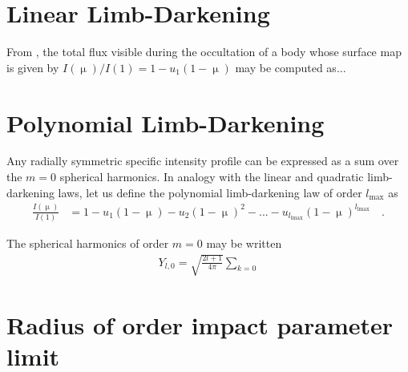 \documentclass[modern]{aastex61}
\begin{document}
%
\section{Linear Limb-Darkening}
\label{sec:reparam}

From \citet{MandelAgol2002}, the total flux visible during the occultation of a  
body whose surface map is given by $I(\upmu)/I(1) = 1 - u_1(1 - \upmu)$ may be computed
as...

%
\section{Polynomial Limb-Darkening}
\label{sec:quad}

Any radially symmetric specific intensity profile can be expressed as a sum
over the $m = 0$ spherical harmonics. In analogy with the linear and quadratic
limb-darkening laws, let us define the polynomial limb-darkening law of
order $l_\mathrm{max}$ as
%
%
\begin{align}
    \label{eq:polynomialld}
    \frac{I(\upmu)}{I(1)} &= 1 - u_1 (1 - \upmu) - u_2 (1 - \upmu)^2 - ... - u_{l_\mathrm{lmax}}(1 - \upmu)^{l_\mathrm{lmax}}
    \quad.
\end{align}
%

The spherical harmonics of order $m = 0$ may be written
%
\begin{align}
    Y_{l,0} = \sqrt{\frac{2l + 1}{4\pi}}
              \sum_{k=0}
\end{align}

\section{Radius of order impact parameter limit}
\end{document}
